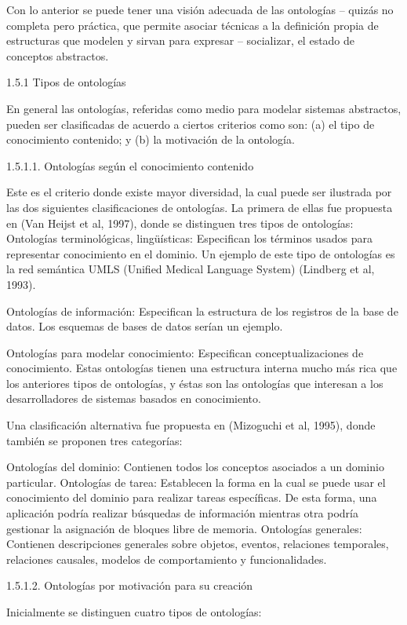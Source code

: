 Con lo anterior se puede tener una visión adecuada de las ontologías – quizás no completa pero práctica, que permite asociar técnicas a la definición propia de estructuras que modelen y sirvan para expresar – socializar, el estado de conceptos abstractos.

1.5.1 Tipos de ontologías
      
En general las ontologías, referidas como medio para modelar sistemas abstractos, pueden ser clasificadas de acuerdo a ciertos criterios como son: (a) el tipo de conocimiento contenido; y (b) la motivación de la ontología.

1.5.1.1. Ontologías según el conocimiento contenido

Este es el criterio donde existe mayor diversidad, la cual puede ser ilustrada por las dos siguientes clasificaciones de ontologías. La primera de ellas fue propuesta en (Van Heijst et al, 1997), donde se distinguen tres tipos de ontologías: 
Ontologías terminológicas, lingüísticas: Especifican los términos usados para representar conocimiento en el dominio. Un ejemplo de este tipo de ontologías es la red semántica UMLS (Unified Medical Language System) (Lindberg et al, 1993).

Ontologías de información: Especifican la estructura de los registros de la base de datos. Los esquemas de bases de datos serían un ejemplo. 

Ontologías para modelar conocimiento: Especifican conceptualizaciones de conocimiento. Estas ontologías tienen una estructura interna mucho más rica que los anteriores tipos de ontologías, y éstas son las ontologías que interesan a los desarrolladores de sistemas basados en conocimiento.      

Una clasificación alternativa fue propuesta en (Mizoguchi et al, 1995), donde también se proponen tres categorías:

Ontologías del dominio: Contienen todos los conceptos asociados a un dominio particular.
Ontologías de tarea: Establecen la forma en la cual se puede usar el conocimiento del dominio para realizar tareas específicas. De esta forma, una aplicación podría realizar búsquedas de información mientras otra podría gestionar la asignación de bloques libre de memoria.
Ontologías generales: Contienen descripciones generales sobre objetos, eventos, relaciones    temporales,   relaciones    causales, modelos de  comportamiento y funcionalidades.

1.5.1.2. Ontologías por motivación para su creación

Inicialmente se distinguen cuatro tipos de ontologías:

